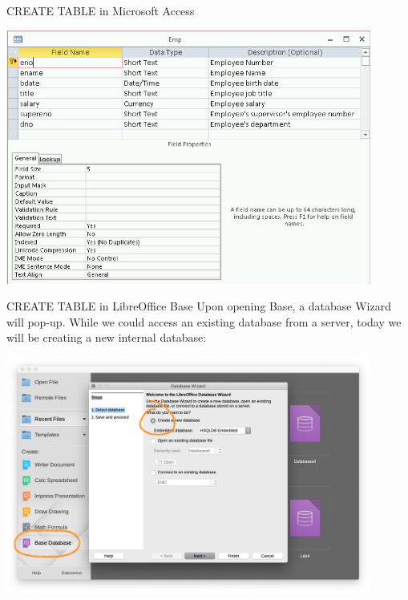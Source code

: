 \documentclass[xcolor=svgnames]{beamer}
\theoremstyle{example}
\begin{document}
\begin{frame}{CREATE TABLE in Microsoft Access}
\begin{center}
\includegraphics[width=0.9\textwidth]{img/createTable}
\end{center}
\end{frame}


\begin{frame}{CREATE TABLE in LibreOffice Base}
Upon opening Base, a database Wizard will pop-up.  While we could access an existing database from a server, today we will be creating a new internal database:
\begin{center}
\includegraphics[width=0.9\textwidth]{img/LibreOffice1}
\end{center}
\end{frame}
\end{document}
